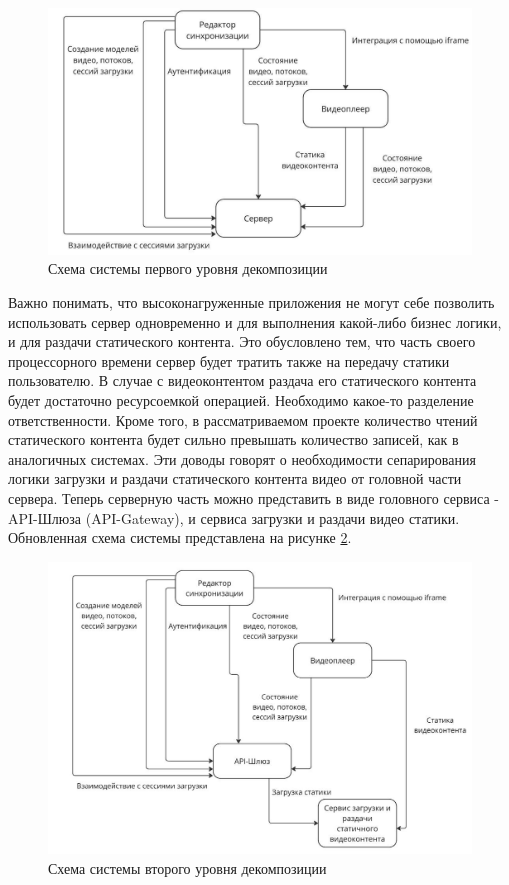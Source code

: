 	\begin{figure}[ht!] 
		\center
		\includegraphics [scale=0.37] {my_folder/images//system_scheme_1}
		\caption{Схема системы первого уровня декомпозиции} 
		\label{fig:system_scheme_1}  
	\end{figure}

	Важно понимать, что высоконагруженные приложения не могут себе позволить использовать сервер одновременно и для выполнения какой-либо бизнес логики, и для раздачи статического контента. Это обусловлено тем, что часть своего процессорного времени сервер будет тратить также на передачу статики пользователю. В случае с видеоконтентом раздача его статического контента будет достаточно ресурсоемкой операцией. Необходимо какое-то разделение ответственности. Кроме того, в рассматриваемом проекте количество чтений статического контента будет сильно превышать количество записей, как в аналогичных системах. Эти доводы говорят о необходимости сепарирования логики загрузки и раздачи статического контента видео от головной части сервера. Теперь серверную часть можно представить в виде головного сервиса - API-Шлюза (API-Gateway), и сервиса загрузки и раздачи видео статики. Обновленная схема системы представлена на рисунке \ref{fig:system_scheme_2}.

	\begin{figure}[ht!] 
		\center
		\includegraphics [scale=0.37] {my_folder/images//system_scheme_2}
		\caption{Схема системы второго уровня декомпозиции} 
		\label{fig:system_scheme_2}  
	\end{figure}
	
